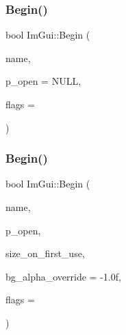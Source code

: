 \mbox{\label{namespace_im_gui_a581e58db0bc930bafa4a5d23093a2b99}} 
\subsubsection{\texorpdfstring{Begin()}{Begin()}\hspace{0.1cm}{\footnotesize\ttfamily [1/2]}}
{\footnotesize\ttfamily bool Im\+Gui\+::\+Begin (\begin{DoxyParamCaption}\item[{const char $\ast$}]{name,  }\item[{bool $\ast$}]{p\+\_\+open = {\ttfamily NULL},  }\item[{\mbox{\hyperlink{imgui_8h_a0b8e067ab4f7a818828c8d89e531addc}{Im\+Gui\+Window\+Flags}}}]{flags = {} }\end{DoxyParamCaption})}

\mbox{\label{namespace_im_gui_a288e01ff1c8102d6374a6b1e409b9878}} 
\subsubsection{\texorpdfstring{Begin()}{Begin()}\hspace{0.1cm}{\footnotesize\ttfamily [2/2]}}
{\footnotesize\ttfamily bool Im\+Gui\+::\+Begin (\begin{DoxyParamCaption}\item[{const char $\ast$}]{name,  }\item[{bool $\ast$}]{p\+\_\+open,  }\item[{const \mbox{\hyperlink{struct_im_vec2}{Im\+Vec2}} \&}]{size\+\_\+on\+\_\+first\+\_\+use,  }\item[{float}]{bg\+\_\+alpha\+\_\+override = {\ttfamily -\/1.0f},  }\item[{\mbox{\hyperlink{imgui_8h_a0b8e067ab4f7a818828c8d89e531addc}{Im\+Gui\+Window\+Flags}}}]{flags = {} }\end{DoxyParamCaption})}

\mbox{\label{namespace_im_gui_a93b10a516e6da427b743906ad97d7f16}} 
